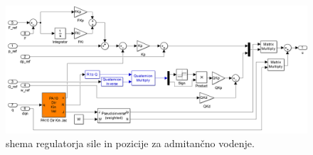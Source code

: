 \begin{figure}[!h]
	\centering
	\includegraphics[trim={0 0cm 0 0cm},scale=0.25]{./Slike/admitance_control.png}
	\caption{\simulink shema regulatorja sile in pozicije za admitan\v{c}no vodenje.}
	\label{fig:admitance_control}
\end{figure}

